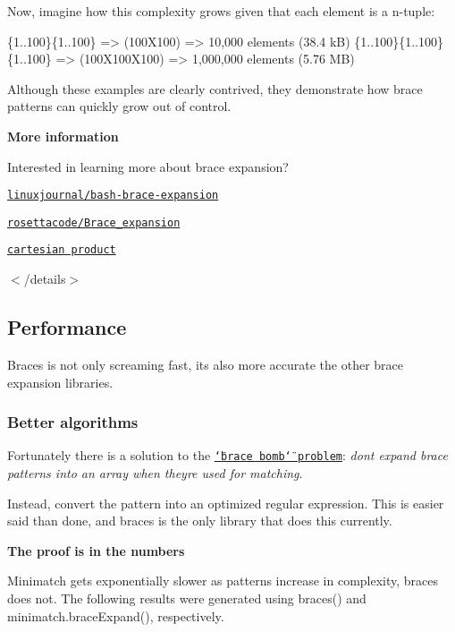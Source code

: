 Now, imagine how this complexity grows given that each element is a n-\/tuple\+:


\begin{DoxyCode}
\{1..100\}\{1..100\}         => (100X100)     => 10,000 elements (38.4 kB)
\{1..100\}\{1..100\}\{1..100\} => (100X100X100) => 1,000,000 elements (5.76 MB)
\end{DoxyCode}


Although these examples are clearly contrived, they demonstrate how brace patterns can quickly grow out of control.

{\bfseries More information}

Interested in learning more about brace expansion?


\begin{DoxyItemize}
\item \href{http://www.linuxjournal.com/content/bash-brace-expansion}{\tt linuxjournal/bash-\/brace-\/expansion}
\item \href{https://rosettacode.org/wiki/Brace_expansion}{\tt rosettacode/\+Brace\+\_\+expansion}
\item \href{https://en.wikipedia.org/wiki/Cartesian_product}{\tt cartesian product}
\end{DoxyItemize}

$<$/details$>$

\subsection*{Performance}

Braces is not only screaming fast, it\textquotesingle{}s also more accurate the other brace expansion libraries.

\subsubsection*{Better algorithms}

Fortunately there is a solution to the \href{#brace-matching-pitfalls}{\tt \char`\"{}brace bomb\char`\"{} problem}\+: {\itshape don\textquotesingle{}t expand brace patterns into an array when they\textquotesingle{}re used for matching}.

Instead, convert the pattern into an optimized regular expression. This is easier said than done, and braces is the only library that does this currently.

{\bfseries The proof is in the numbers}

Minimatch gets exponentially slower as patterns increase in complexity, braces does not. The following results were generated using {\ttfamily braces()} and {\ttfamily minimatch.\+brace\+Expand()}, respectively.

